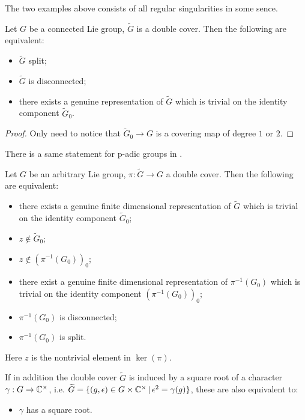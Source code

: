 \begin{rk}
  The two examples above consists of all regular singularities in some sence.
\end{rk}




\begin{lem}
  Let $G$ be a connected Lie group, $\widetilde{G}$ is a double cover. Then the following are equivalent:
  \begin{itemize}
    \item $\widetilde{G}$ split;
    \item $\widetilde{G}$ is disconnected;
    \item there exists a genuine representation of $\widetilde{G}$ which is trivial on the identity component $\widetilde{G}_0$.
  \end{itemize}
\end{lem}

\begin{proof}
  Only need to notice that $\widetilde{G}_{0} \to G$ is a covering map of degree $1$ or $2$.
\end{proof}

There is a same statement for p-adic groups in \cite{Nev99}.


\begin{lem}
  Let $G$ be an arbitrary Lie group, $\pi : \widetilde{G} \to G$ a double cover. Then the following are equivalent:
  \begin{itemize}
    \item there exists a genuine finite dimensional representation of $\widetilde{G}$ which is trivial on the identity component $\widetilde{G}_0$;
    \item $z \notin \widetilde{G}_0$;
    \item $z \notin (\pi^{-1}(G_0))_0$;
    \item there exist a genuine finite dimensional representation of $\pi^{-1}(G_0)$ which is trivial on the identity component $(\pi^{-1}(G_0))_0$;
    \item $\pi^{-1}(G_0)$ is disconnected;
    \item $\pi^{-1}(G_0)$ is split.
  \end{itemize}
  Here $z$ is the nontrivial element in $\ker(\pi)$.

  If in addition the double cover $\widetilde{G}$ is induced by a square root of a character $\gamma : G \to \mathbb{C}^{\times}$, i.e. $\widetilde{G} = \{(g,\epsilon) \in G \times \mathbb{C}^{\times}\,|\,\epsilon^2 = \gamma(g)\}$, these are also equivalent to:
  \begin{itemize}
    \item $\gamma$ has a square root.
  \end{itemize}
\end{lem}

